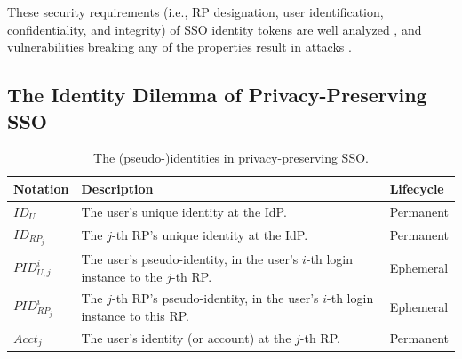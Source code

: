 These security requirements (i.e., RP designation, user identification, confidentiality, and integrity) of SSO identity tokens
     are well analyzed \cite{ArmandoCCCT08,FettKS16, FettKS17},
     and
     vulnerabilities breaking any of the properties
            result in attacks \cite{SomorovskyMSKJ12, WangCW12, ArmandoCCCPS13, ZhouE14, WangZLLYLG15, WangZLG16, YangLLZH16, MainkaMS16, MainkaMSW17, YangLCZ18, YangLS17, ShiWL19, ChenPCTKT14, ccsSunB12, DiscoveringJCS, dimvaLiM16, CaoSBKVC14, TowardsShehabM14}.




\subsection{The Identity Dilemma of Privacy-Preserving SSO}
\label{subsec:challenges}
\begin{table}[t]
\footnotesize
    \caption{The (pseudo-)identities in privacy-preserving SSO.}
    \centering
    \begin{tabular}{|p{1.0cm}|p{5.1cm}|p{1.13cm}|} \hline
    {\textbf{Notation}} & {\textbf{Description}} & {\textbf{Lifecycle}} \\ \hline
    {$ID_U$} & {The user's unique identity at the IdP.} & {Permanent} \\ \hline
    {$ID_{RP_j}$} & {The $j$-th RP's unique identity at the IdP.} & {Permanent} \\ \hline
    {$PID_{U,j}^i$} & {The user's pseudo-identity, in the user's $i$-th login instance to the $j$-th RP.} & {Ephemeral} \\ \hline
    {$PID_{RP_j}^i$} & {The $j$-th RP's pseudo-identity, in the user's $i$-th login instance to this RP.} & {Ephemeral} \\ \hline
    {$Acct_j$} & {The user's identity (or account) at the $j$-th RP.} & {Permanent} \\ \hline
    \end{tabular}
    \label{tbl:notations-dilemma}
\end{table}


